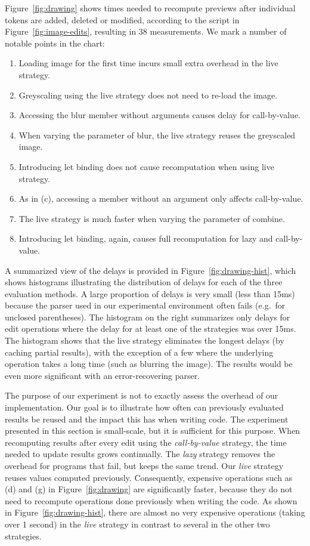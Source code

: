 \documentclass[english,submission]{programming}
\theoremstyle{plain}
\theoremstyle{definition}
\begin{document}
Figure~\ref{fig:drawing} shows times needed to recompute previews after individual tokens
are added, deleted or modified, according to the script in
Figure~\ref{fig:image-edits}, resulting in 38 measurements. We mark a number of notable points in the chart:

\begin{enumerate}[itemsep=0em,label=\alph*.]
\item Loading image for the first time incurs small extra overhead in the live strategy.
\item Greyscaling using the live strategy does not need to re-load the image.
\item Accessing the blur member without arguments causes delay for call-by-value.
\item When varying the parameter of blur, the live strategy reuses the greyscaled image.
\item Introducing let binding does not cause recomputation when using live strategy.
\item As in (c), accessing a member without an argument only affects call-by-value.
\item The live strategy is much faster when varying the parameter of combine.
\item Introducing let binding, again, causes full recomputation for lazy and call-by-value.
\end{enumerate}

\noindent
A summarized view of the delays is provided in Figure~\ref{fig:drawing-hist}, which shows
histograms illustrating the distribution of delays for each of the three evaluation methods.
A large proportion of delays is very small (less than 15ms) because the parser used in our
experimental environment often fails (e.g.~for unclosed parentheses). The histogram
on the right summarizes only delays for edit operations where the delay for at least one of
the strategies was over 15ms. The histogram shows that the live strategy eliminates the longest
delays (by caching partial results), with the exception of a few where the underlying operation
takes a long time (such as blurring the image). The results would be even more significant with
an error-recovering parser.

The purpose of our experiment is not to exactly assess the overhead of our implementation.
Our goal is to illustrate how often can previously evaluated results be reused and the impact
this has when writing code. The experiment presented in this section is small-scale, but it is
sufficient for this purpose. When recomputing results after every edit
using the \emph{call-by-value} strategy, the time needed to update results grows
continually. The \emph{lazy} strategy removes the overhead for programs that fail, but
keeps the same trend. Our \emph{live} strategy reuses values computed
previously. Consequently, expensive operations such as (d) and (g) in Figure~\ref{fig:drawing}
are significantly faster, because they do not need to recompute operations done previously when
writing the code. As shown in Figure~\ref{fig:drawing-hist}, there are almost no very expensive
operations (taking over 1 second) in the \emph{live} strategy in contrast to several in the
other two strategies.
\end{document}
